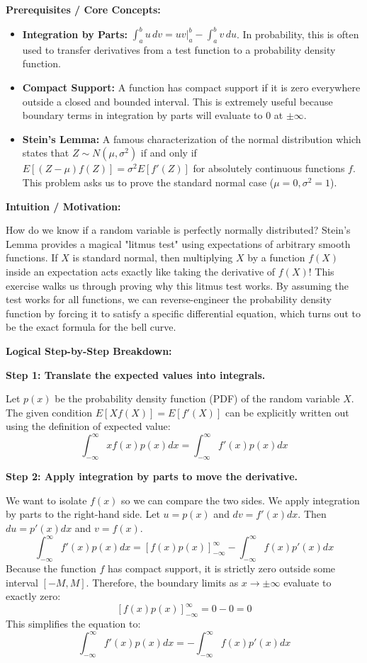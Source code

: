 \begin{solution}
\textbf{Prerequisites / Core Concepts:}
\begin{itemize}
    \item \textbf{Integration by Parts:} $\int_a^b u \, dv = uv|_a^b - \int_a^b v \, du$. In probability, this is often used to transfer derivatives from a test function to a probability density function.
    \item \textbf{Compact Support:} A function has compact support if it is zero everywhere outside a closed and bounded interval. This is extremely useful because boundary terms in integration by parts will evaluate to 0 at $\pm\infty$.
    \item \textbf{Stein's Lemma:} A famous characterization of the normal distribution which states that $Z \sim N(\mu, \sigma^2)$ if and only if $E[(Z-\mu)f(Z)] = \sigma^2 E[f'(Z)]$ for absolutely continuous functions $f$. This problem asks us to prove the standard normal case ($\mu=0, \sigma^2=1$).
\end{itemize}

\textbf{Intuition / Motivation:}

How do we know if a random variable is perfectly normally distributed? Stein's Lemma provides a magical "litmus test" using expectations of arbitrary smooth functions. If $X$ is standard normal, then multiplying $X$ by a function $f(X)$ inside an expectation acts exactly like taking the derivative of $f(X)$! This exercise walks us through proving why this litmus test works. By assuming the test works for all functions, we can reverse-engineer the probability density function by forcing it to satisfy a specific differential equation, which turns out to be the exact formula for the bell curve.

\textbf{Logical Step-by-Step Breakdown:}

\textbf{Step 1: Translate the expected values into integrals.}

Let $p(x)$ be the probability density function (PDF) of the random variable $X$.
The given condition $E[Xf(X)] = E[f'(X)]$ can be explicitly written out using the definition of expected value:
\[ \int_{-\infty}^{\infty} x f(x) p(x) dx = \int_{-\infty}^{\infty} f'(x) p(x) dx \]

\textbf{Step 2: Apply integration by parts to move the derivative.}

We want to isolate $f(x)$ so we can compare the two sides. We apply integration by parts to the right-hand side.
Let $u = p(x)$ and $dv = f'(x) dx$. Then $du = p'(x) dx$ and $v = f(x)$.
\[ \int_{-\infty}^{\infty} f'(x) p(x) dx = \left[ f(x) p(x) \right]_{-\infty}^{\infty} - \int_{-\infty}^{\infty} f(x) p'(x) dx \]
Because the function $f$ has compact support, it is strictly zero outside some interval $[-M, M]$. Therefore, the boundary limits as $x \to \pm \infty$ evaluate to exactly zero:
\[ \left[ f(x) p(x) \right]_{-\infty}^{\infty} = 0 - 0 = 0 \]
This simplifies the equation to:
\[ \int_{-\infty}^{\infty} f'(x) p(x) dx = - \int_{-\infty}^{\infty} f(x) p'(x) dx \]


\end{solution}
